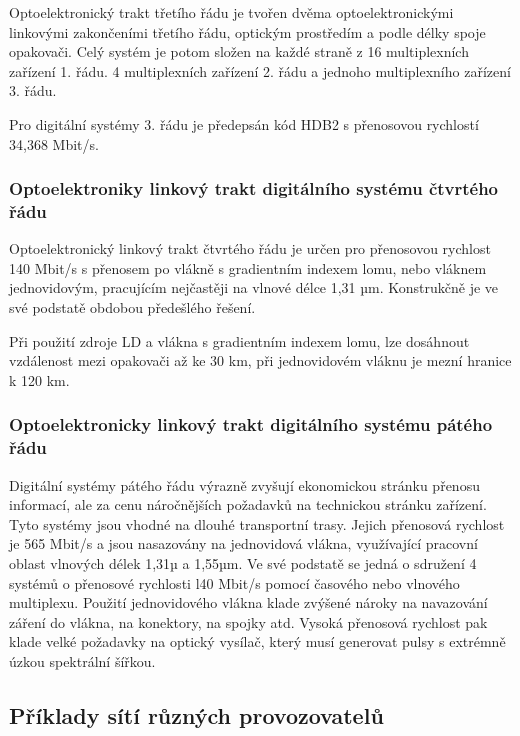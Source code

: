 Optoelektronický trakt třetího řádu je tvořen dvěma optoelektronickými linkovými zakončeními třetího řádu, optickým prostředím a podle délky spoje opakovači. Celý systém je potom složen na každé straně z 16 multiplexních zařízení 1. řádu. 4 multiplexních zařízení 2. řádu a jednoho multiplexního zařízení 3. řádu.

Pro digitální systémy 3. řádu je předepsán kód HDB2 s přenosovou rychlostí 34,368 Mbit/s.

\subsubsection{Optoelektroniky linkový trakt digitálního systému čtvrtého řádu}
Optoelektronický linkový trakt čtvrtého řádu je určen pro přenosovou rychlost 140 Mbit/s s přenosem po vlákně s gradientním indexem lomu, nebo vláknem jednovidovým, pracujícím nejčastěji na vlnové délce 1,31 µm. Konstrukčně je ve své podstatě obdobou předešlého řešení.

Při použití zdroje LD a vlákna s gradientním indexem lomu, lze dosáhnout vzdálenost mezi opakovači až ke 30 km, při jednovidovém vláknu je mezní hranice k 120 km.

\subsubsection{Optoelektronicky linkový trakt digitálního systému pátého řádu}
Digitální systémy pátého řádu výrazně zvyšují ekonomickou stránku přenosu informací, ale za cenu náročnějších požadavků na technickou stránku zařízení. Tyto systémy jsou vhodné na dlouhé transportní trasy. Jejich přenosová rychlost je 565 Mbit/s a jsou nasazovány na jednovidová vlákna, využívající pracovní oblast vlnových délek 1,31µ a 1,55µm. Ve své podstatě se jedná o sdružení 4 systémů o přenosové rychlosti l40 Mbit/s pomocí časového nebo vlnového multiplexu. Použití jednovidového vlákna klade zvýšené nároky na navazování záření do vlákna, na konektory, na spojky atd. Vysoká přenosová rychlost pak klade velké požadavky na optický vysílač, který musí generovat pulsy s extrémně úzkou spektrální šířkou.

\subsection{Příklady sítí různých provozovatelů}



\clearpage
